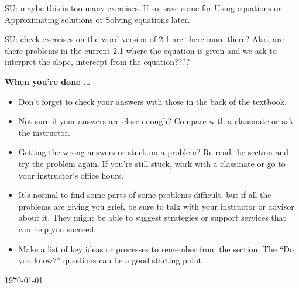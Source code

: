 \begin{enumerate}
SU:  maybe this is too many exercises.  If so, save some for Using equations or Approximating solutions or Solving equations later.
\end{enumerate}

SU:  check exercises on the word version of 2.1 are there more there?  Also, are there problems in the current 2.1 where the equation is given and we ask to interpret the slope, intercept from the equation????

\bigskip

\noindent \textbf{When you're done \ldots}

\begin{itemize}
\item Don't forget to check your answers with those in the back of the textbook. 
\item Not sure if your answers are close enough? Compare with a classmate or ask the instructor.  
\item Getting the wrong answers or stuck on a problem?  Re-read the section and try the problem again.   If you're still stuck, work with a classmate or go to your instructor's office hours.
\item It's normal to find some parts of some problems difficult, but if all the problems are giving you grief, be sure to talk with your instructor or advisor about it.  They might be able to suggest strategies or support services that can help you succeed.
\item Make a list of key ideas or processes to remember from the section.  The ``Do you know?'' questions can be a good starting point.
\end{itemize}

\today

